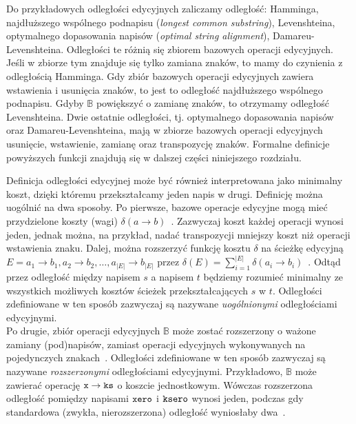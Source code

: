 \documentclass{praca1}
\begin{document}
Do przykładowych odległości edycyjnych zaliczamy odległość: Hamminga, najdłuższego wspólnego podnapisu (\emph{longest common substring}), Levenshteina, optymalnego dopasowania napisów (\emph{optimal string alignment}), Damareu-Levenshteina. Odległości te różnią się zbiorem bazowych operacji edycyjnych. Jeśli w zbiorze tym znajduje się tylko zamiana znaków, to mamy do czynienia z odległością Hamminga. Gdy zbiór bazowych operacji edycyjnych zawiera wstawienia i usunięcia znaków, to jest to odległość najdłuższego wspólnego podnapisu. Gdyby $\mathbb{B}$ powiększyć o zamianę znaków, to otrzymamy odległość Levenshteina. Dwie ostatnie odległości, tj. optymalnego dopasowania napisów oraz Damareu-Levenshteina, mają w zbiorze bazowych operacji edycyjnych usunięcie, wstawienie, zamianę oraz transpozycję znaków. Formalne definicje powyższych funkcji znajdują się w dalszej części niniejszego rozdziału.




Definicja odległości edycyjnej może być również interpretowana jako minimalny koszt, dzięki któremu przekształcamy jeden napis w drugi. Definicję można uogólnić na dwa sposoby. Po pierwsze, bazowe operacje edycyjne mogą mieć przydzielone koszty (wagi) $\delta(a \rightarrow b)$~\cite{Wagner1974:stringtostring}. Zazwyczaj koszt każdej operacji wynosi jeden, jednak można, na przykład, nadać transpozycji mniejszy koszt niż operacji wstawienia znaku. Dalej, można rozszerzyć funkcję kosztu $\delta$ na ścieżkę edycyjną $E = a_1 \rightarrow b_1, a_2 \rightarrow b_2, \ldots, a_{|E|} \rightarrow b_{|E|}$ przez $\delta(E) = \sum\limits_{i=1}^{|E|}\delta(a_i \rightarrow b_i)$~\cite{Boytsov2011:indexingmethods}. Odtąd przez odległość między napisem $s$ a napisem $t$ będziemy rozumieć minimalny ze wszystkich możliwych kosztów ścieżek przekształcających $s$ w $t$. Odległości zdefiniowane w ten sposób zazwyczaj są nazywane \emph{uogólnionymi} odległościami edycyjnymi.\\
Po drugie, zbiór operacji edycyjnych $\mathbb{B}$ może zostać rozszerzony o ważone zamiany (pod)napisów, zamiast operacji edycyjnych wykonywanych na pojedynczych znakach~\cite{Ukkonen1985:algorithmsforapprox}. Odległości zdefiniowane w ten sposób zazwyczaj są nazywane \emph{rozszerzonymi} odległościami edycyjnymi. Przykładowo, $\mathbb{B}$ może zawierać operację $\verb|x| \rightarrow \verb|ks|$ o koszcie jednostkowym. Wówczas rozszerzona odległość pomiędzy napisami $\verb|xero|$ i $\verb|ksero|$ wynosi jeden, podczas gdy standardowa (zwykła, nierozszerzona) odległość wyniosłaby dwa~\cite{Boytsov2011:indexingmethods}.
\end{document}
